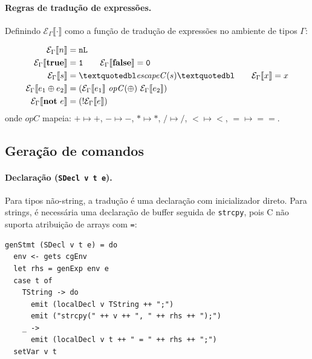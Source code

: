 \paragraph{Regras de tradução de expressões.}

Definindo $\mathcal{E}_\Gamma\llbracket \cdot \rrbracket$ como a função de
tradução de expressões no ambiente de tipos $\Gamma$:

\begin{Definition}\label{def:tline-exp}
  \begin{align*}
    \mathcal{E}_\Gamma\llbracket n \rrbracket &= \mathtt{nL} \\
    \mathcal{E}_\Gamma\llbracket \mathbf{true} \rrbracket &= \mathtt{1} \qquad
    \mathcal{E}_\Gamma\llbracket \mathbf{false} \rrbracket = \mathtt{0} \\
    \mathcal{E}_\Gamma\llbracket s \rrbracket &=
    \mathtt{\textquotedbl}\mathit{escapeC}(s)\mathtt{\textquotedbl} \qquad
    \mathcal{E}_\Gamma\llbracket x \rrbracket = x \\
    \mathcal{E}_\Gamma\llbracket e_1 \oplus e_2 \rrbracket
    &= \mathtt{(}\mathcal{E}_\Gamma\llbracket e_1
      \rrbracket\ \mathit{opC}(\oplus)\ \mathcal{E}_\Gamma\llbracket
    e_2 \rrbracket\mathtt{)} \\
    \mathcal{E}_\Gamma\llbracket \mathbf{not}\ e \rrbracket
    &= \mathtt{(!}\mathcal{E}_\Gamma\llbracket e \rrbracket\mathtt{)}
  \end{align*}
  onde $\mathit{opC}$ mapeia: $+{\mapsto}\mathtt{+}$,
  $-{\mapsto}\mathtt{-}$, $*{\mapsto}\mathtt{*}$,
  $/{}\mapsto\mathtt{/}$, $<{\mapsto}\mathtt{<}$,
  $={\mapsto}\mathtt{==}$.
\end{Definition}

\subsection{Geração de comandos}

\paragraph{Declaração (\texttt{SDecl v t e}).}
Para tipos não-string, a tradução é uma declaração com inicializador direto.
Para strings, é necessária uma declaração de buffer seguida de
\texttt{strcpy}, pois C não suporta atribuição de arrays com \texttt{=}:

\begin{verbatim}
genStmt (SDecl v t e) = do
  env <- gets cgEnv
  let rhs = genExp env e
  case t of
    TString -> do
      emit (localDecl v TString ++ ";")
      emit ("strcpy(" ++ v ++ ", " ++ rhs ++ ");")
    _ ->
      emit (localDecl v t ++ " = " ++ rhs ++ ";")
  setVar v t
\end{verbatim}

